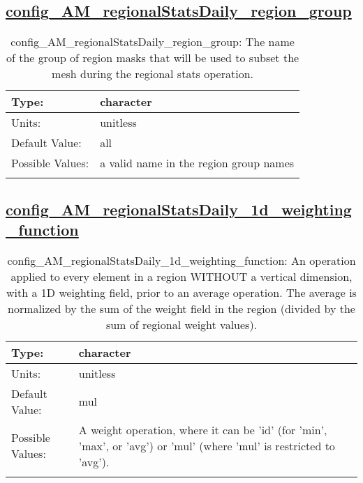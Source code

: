 \subsection[config\_AM\_regionalStatsDaily\_region\_group]{\hyperref[sec:nm_tab_AM_regionalStatsDaily]{config\_AM\_regionalStatsDaily\_region\_group}}
\label{subsec:nm_sec_config_AM_regionalStatsDaily_region_group}
\begin{center}
\begin{longtable}{| p{2.0in} || p{4.0in} |}
    \hline
    Type: & character \\
    \hline
    Units: & \si{unitless} \\
    \hline
    Default Value: & all \\
    \hline
    Possible Values: & a valid name in the region group names \\
    \hline
    \caption{config\_AM\_regionalStatsDaily\_region\_group: The name of the group of region masks that will be used to subset the mesh during the regional stats operation.}
\end{longtable}
\end{center}
\subsection[config\_AM\_regionalStatsDaily\_1d\_weighting\_function]{\hyperref[sec:nm_tab_AM_regionalStatsDaily]{config\_AM\_regionalStatsDaily\_1d\_weighting\_function}}
\label{subsec:nm_sec_config_AM_regionalStatsDaily_1d_weighting_function}
\begin{center}
\begin{longtable}{| p{2.0in} || p{4.0in} |}
    \hline
    Type: & character \\
    \hline
    Units: & \si{unitless} \\
    \hline
    Default Value: & mul \\
    \hline
    Possible Values: & A weight operation, where it can be 'id' (for 'min', 'max', or 'avg') or 'mul' (where 'mul' is restricted to 'avg'). \\
    \hline
    \caption{config\_AM\_regionalStatsDaily\_1d\_weighting\_function: An operation applied to every element in a region WITHOUT a vertical dimension, with a 1D weighting field, prior to an average operation. The average is normalized by the sum of the weight field in the region (divided by the sum of regional weight values).}
\end{longtable}
\end{center}

